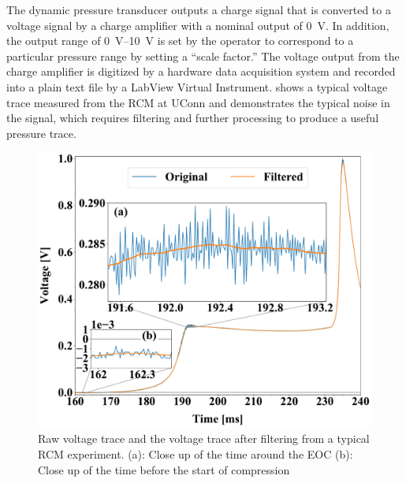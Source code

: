 \documentclass[12pt]{ussci}
\begin{document}
The dynamic pressure transducer outputs a charge signal that is converted to a
voltage signal by a charge amplifier with a nominal output of \SI{0}{\V}. In
addition, the output range of \SIrange{0}{10}{\V} is set by the operator to
correspond to a particular pressure range by setting a ``scale factor.'' The
voltage output from the charge amplifier is digitized by a hardware data
acquisition system and recorded into a plain text file by a LabView Virtual
Instrument.  shows a typical voltage trace measured from
the RCM at UConn and demonstrates the typical noise in the signal, which
requires filtering and further processing to produce a useful pressure trace.

\begin{figure}[htbp]
    \begin{minipage}[t]{0.48\textwidth}
        \centering
        \includegraphics[width=\linewidth]{figures/raw-voltage.pdf}
        \caption{Raw voltage trace and the voltage trace after filtering from a typical
        RCM experiment. (a): Close up of the
        time around the EOC (b): Close up of the time before the start of
        compression}
        \label{fig:raw-voltage}
    \end{minipage}\hfill%
    \begin{minipage}[t]{0.48\textwidth}
        \centering

\end{minipage}
\end{figure}
\end{document}

